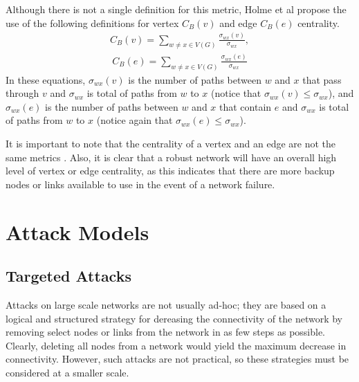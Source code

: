 \documentclass[doc]{apa}%
\begin{document}
Although there is not a single definition for this metric, Holme et al \cite{Attacks} propose the use of the following definitions for vertex $C_{B}(v)$ and edge $C_{B}(e)$ centrality.
\begin{eqnarray}
C_{B}(v) = \sum_{w \not= x \in V(G)} \frac{\sigma_{wx}(v)}{\sigma_{wx}},
\end{eqnarray}
\begin{eqnarray}
C_{B}(e) = \sum_{w \not= x \in V(G)} \frac{\sigma_{wx}(e)}{\sigma_{wx}}
\end{eqnarray}
In these equations, $\sigma_{wx}(v)$ is the number of paths between $w$ and $x$ that pass through $v$ and $\sigma_{wx}$ is total of paths from $w$ to $x$ (notice that $\sigma_{wx}(v) \leq \sigma_{wx}$), and $\sigma_{wx}(e)$ is the number of paths between $w$ and $x$ that contain $e$ and $\sigma_{wx}$ is total of paths from $w$ to $x$ (notice again that $\sigma_{wx}(e) \leq \sigma_{wx}$).

It is important to note that the centrality of a vertex and an edge are not the same metrics \cite{Attacks}. Also, it is clear that a robust network will have an overall high level of vertex or edge centrality, as this indicates that there are more backup nodes or links available to use in the event of a network failure.



\section{Attack Models}
\label{AttackStrategies}

\subsection{Targeted Attacks}
Attacks on large scale networks are not usually ad-hoc; they are based on a logical and structured strategy for dereasing the connectivity of the network by removing select nodes or links from the network in as few steps as possible. Clearly, deleting all nodes from a network would yield the maximum decrease in connectivity. However, such attacks are not practical, so these strategies must be considered at a smaller scale. 
\end{document}
